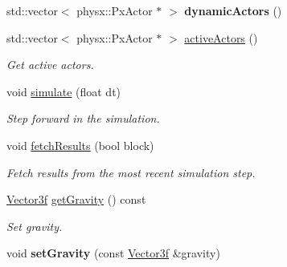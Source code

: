 \begin{Indent}
\begin{DoxyCompactItemize}
\mbox{\label{classrev_1_1_physics_scene_a5795d429c97b3c0248244c4fee3e7425}} 
std\+::vector$<$ physx\+::\+Px\+Actor $\ast$ $>$ {\bfseries dynamic\+Actors} ()
\item 
\mbox{\label{classrev_1_1_physics_scene_a1e2bb7bf3dd586ed32138d50b5c9a782}} 
std\+::vector$<$ physx\+::\+Px\+Actor $\ast$ $>$ \mbox{\hyperlink{classrev_1_1_physics_scene_a1e2bb7bf3dd586ed32138d50b5c9a782}{active\+Actors}} ()
\begin{DoxyCompactList}\small\item\em Get active actors. \end{DoxyCompactList}\item 
\mbox{\label{classrev_1_1_physics_scene_a729e6f99fe77acf5dff7425a7d89752e}} 
void \mbox{\hyperlink{classrev_1_1_physics_scene_a729e6f99fe77acf5dff7425a7d89752e}{simulate}} (float dt)
\begin{DoxyCompactList}\small\item\em Step forward in the simulation. \end{DoxyCompactList}\item 
\mbox{\label{classrev_1_1_physics_scene_ad2625ecb82a94c29649553fea6f06984}} 
void \mbox{\hyperlink{classrev_1_1_physics_scene_ad2625ecb82a94c29649553fea6f06984}{fetch\+Results}} (bool block)
\begin{DoxyCompactList}\small\item\em Fetch results from the most recent simulation step. \end{DoxyCompactList}\item 
\mbox{\label{classrev_1_1_physics_scene_a3ca30f34297ce07f161365b325d9fc5b}} 
\mbox{\hyperlink{classrev_1_1_vector}{Vector3f}} \mbox{\hyperlink{classrev_1_1_physics_scene_a3ca30f34297ce07f161365b325d9fc5b}{get\+Gravity}} () const
\begin{DoxyCompactList}\small\item\em Set gravity. \end{DoxyCompactList}\item 
\mbox{\label{classrev_1_1_physics_scene_a61ce56ac575f7d2be0873050c65ff0ee}} 
void {\bfseries set\+Gravity} (const \mbox{\hyperlink{classrev_1_1_vector}{Vector3f}} \&gravity)

\end{DoxyCompactItemize}
\end{Indent}
